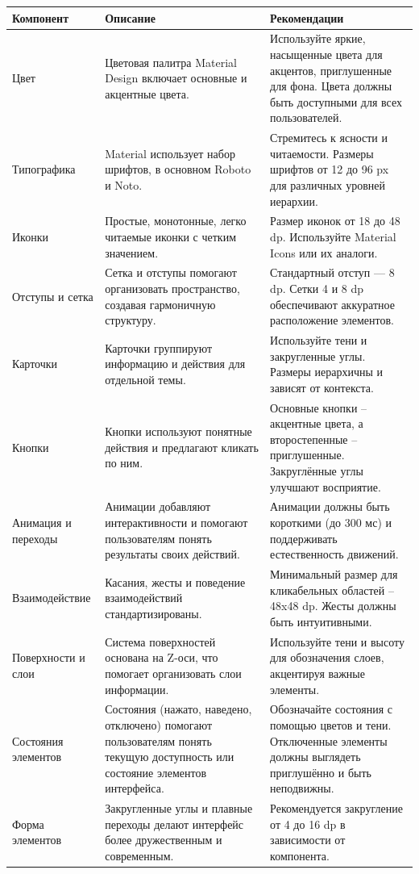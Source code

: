 \begin{table}[H]
    \small
    \begin{tabular}{|p{3cm}|p{5cm}|p{6cm}|}
\hline
\textbf{Компонент} & \textbf{Описание} & \textbf{Рекомендации} \\
\hline
Цвет & Цветовая палитра Material Design включает основные и акцентные цвета. & Используйте яркие, насыщенные цвета для акцентов, приглушенные для фона. Цвета должны быть доступными для всех пользователей. \\
\hline
Типографика & Material использует набор шрифтов, в основном Roboto и Noto. & Стремитесь к ясности и читаемости. Размеры шрифтов от 12 до 96 px для различных уровней иерархии. \\
\hline
Иконки & Простые, монотонные, легко читаемые иконки с четким значением. & Размер иконок от 18 до 48 dp. Используйте Material Icons или их аналоги. \\
\hline
Отступы и сетка & Сетка и отступы помогают организовать пространство, создавая гармоничную структуру. & Стандартный отступ — 8 dp. Сетки 4 и 8 dp обеспечивают аккуратное расположение элементов. \\
\hline
Карточки & Карточки группируют информацию и действия для отдельной темы. & Используйте тени и закругленные углы. Размеры иерархичны и зависят от контекста. \\
\hline
Кнопки & Кнопки используют понятные действия и предлагают кликать по ним. & Основные кнопки – акцентные цвета, а второстепенные – приглушенные. Закруглённые углы улучшают восприятие. \\
\hline
Анимация и переходы & Анимации добавляют интерактивности и помогают пользователям понять результаты своих действий. & Анимации должны быть короткими (до 300 мс) и поддерживать естественность движений. \\
\hline
Взаимодействие & Касания, жесты и поведение взаимодействий стандартизированы. & Минимальный размер для кликабельных областей – 48x48 dp. Жесты должны быть интуитивными. \\
\hline
Поверхности и слои & Система поверхностей основана на Z-оси, что помогает организовать слои информации. & Используйте тени и высоту для обозначения слоев, акцентируя важные элементы. \\
\hline
Состояния элементов & Состояния (нажато, наведено, отключено) помогают пользователям понять текущую доступность или состояние элементов интерфейса. & Обозначайте состояния с помощью цветов и тени. Отключенные элементы должны выглядеть приглушённо и быть неподвижны. \\
\hline
Форма элементов & Закругленные углы и плавные переходы делают интерфейс более дружественным и современным. & Рекомендуется закругление от 4 до 16 dp в зависимости от компонента. \\
\hline
\end{tabular}
\end{table}

